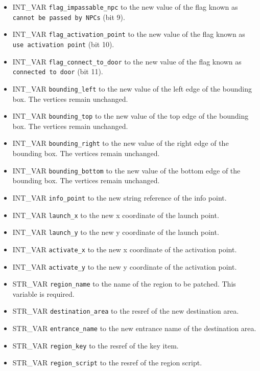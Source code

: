 \documentclass{article}
\def\t#1{{\tt #1}}
\begin{document}
\begin{itemize}
\item INT_VAR \verb+flag_impassable_npc+ to the new value of the flag known as \t{cannot be passed by NPCs} (bit 9).
\item INT_VAR \verb+flag_activation_point+ to the new value of the flag known as \t{use activation point} (bit 10).
\item INT_VAR \verb+flag_connect_to_door+ to the new value of the flag known as \t{connected to door} (bit 11).
\item INT_VAR \verb+bounding_left+ to the new value of the left edge of the bounding box. The vertices remain unchanged.
\item INT_VAR \verb+bounding_top+ to the new value of the top edge of the bounding box. The vertices remain unchanged.
\item INT_VAR \verb+bounding_right+ to the new value of the right edge of the bounding box. The vertices remain unchanged.
\item INT_VAR \verb+bounding_bottom+ to the new value of the bottom edge of the bounding box. The vertices remain unchanged.
\item INT_VAR \verb+info_point+ to the new string reference of the info point.
\item INT_VAR \verb+launch_x+ to the new x coordinate of the launch point.
\item INT_VAR \verb+launch_y+ to the new y coordinate of the launch point.
\item INT_VAR \verb+activate_x+ to the new x coordinate of the activation point.
\item INT_VAR \verb+activate_y+ to the new y coordinate of the activation point.
\item STR_VAR \verb+region_name+ to the name of the region to be patched. This variable is required.
\item STR_VAR \verb+destination_area+ to the resref of the new destination area.
\item STR_VAR \verb+entrance_name+ to the new entrance name of the destination area.
\item STR_VAR \verb+region_key+ to the resref of the key item.
\item STR_VAR \verb+region_script+ to the resref of the region script.
\end{itemize}
\\
\end{document}
